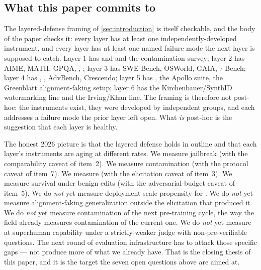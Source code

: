 \subsection{What this paper commits to}
\label{sec:contradictions-commitments}

The layered-defense framing of \cref{sec:introduction} is itself
checkable, and the body of the paper checks it: every layer has
at least one independently-developed instrument, and every layer
has at least one named failure mode the next layer is supposed to
catch. Layer 1 has  and  and the contamination
survey; layer 2 has AIME, MATH, GPQA, , ; layer 3
has SWE-Bench, OSWorld, GAIA, $\tau$-Bench; layer 4 has ,
, AdvBench, Crescendo; layer 5 has ,
the Apollo  suite, the Greenblatt alignment-faking setup;
layer 6 has the Kirchenbauer/SynthID watermarking line and the
Irving/Khan  line. The framing is therefore not post-hoc:
the instruments exist, they were developed by independent groups,
and each addresses a failure mode the prior layer left open. What
\emph{is} post-hoc is the suggestion that each layer is healthy.

The honest 2026 picture is that the layered defense holds in
outline and that each layer's instruments are aging at different
rates. We measure jailbreak  (with the comparability caveat of
item~2). We measure contamination (with the protocol caveat of
item~7). We measure  (with the elicitation
caveat of item~3). We measure  survival under benign
edits (with the adversarial-budget caveat of item~5). We do
\emph{not} yet measure deployment-scale propensity for .
We do \emph{not} yet measure alignment-faking generalization
outside the elicitation that produced it. We do \emph{not} yet
measure contamination of the next pre-training cycle, the way the
field already measures contamination of the current one. We do
\emph{not} yet measure  at superhuman
capability under a strictly-weaker judge with non-pre-verifiable
questions. The next round of evaluation infrastructure has to
attack those specific gaps --- not produce more of what we already
have. That is the closing thesis of this paper, and it is the
target the seven open questions above are aimed at.
